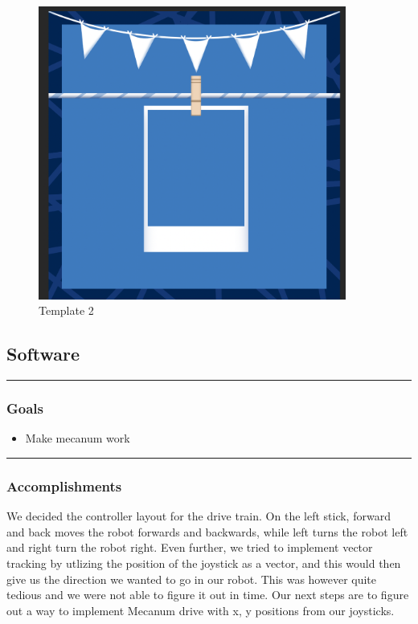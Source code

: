 \begin{figure}[htp]
\centering
\includegraphics[width=0.9\textwidth, angle=0]{Meetings/August/08-24-21/2.PNG}
\caption{Template 2}
\label{fig:pic2}
\end{figure}

\subsection*{Software}
\noindent\hfil\rule{\textwidth}{.4pt}\hfil
\subsubsection{Goals}
\begin{itemize}
    \item Make mecanum work

\end{itemize} 

\noindent\hfil\rule{\textwidth}{.4pt}\hfil

\subsubsection*{Accomplishments}
We decided the controller layout for the drive train. On the left stick, forward and back moves the robot forwards and backwards, while left turns the robot left and right turn the robot right. Even further, we tried to implement vector tracking by utlizing the position of the joystick as a vector, and this would then give us the direction we wanted to go in our robot. This was however quite tedious and we were not able to figure it out in time. Our next steps are to figure out a way to implement Mecanum drive with x, y positions from our joysticks.

